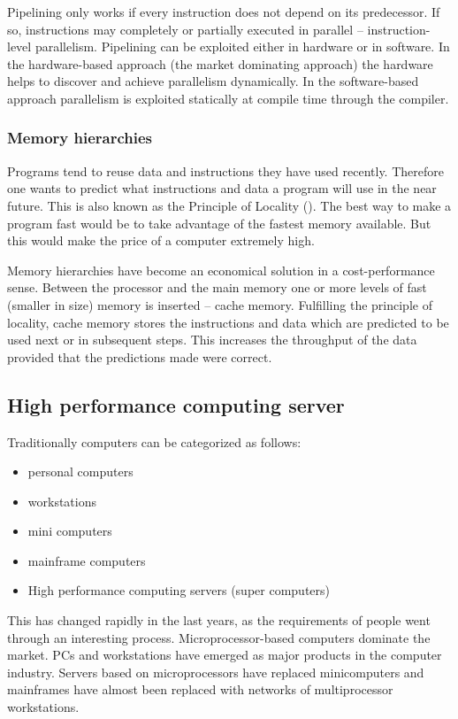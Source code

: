 Pipelining only works if every instruction does not depend on its
predecessor. If so, instructions may completely or partially executed
in parallel -- instruction-level parallelism.
Pipelining can be
exploited either in hardware or in software. In the hardware-based
approach (the market dominating approach) the hardware helps to
discover and achieve parallelism dynamically. In the software-based
approach parallelism is exploited statically at compile time through the
compiler. 

\subsubsection{Memory hierarchies}

Programs tend to reuse data and instructions they have used
recently. Therefore one wants to predict what instructions and data a
program will use in the near future. This is also known as the
Principle of Locality (\cite{computerarchitecture}). The best way to
make a program fast would be to take advantage of the fastest memory
available. But this would make the price of a computer extremely
high.

Memory hierarchies have become an economical solution in a
cost-performance sense. Between the processor and the main memory one
or more levels of fast (smaller in size) memory is inserted -- cache
memory. Fulfilling the principle of locality, cache memory stores the
instructions and data which are predicted to be used next or in
subsequent steps. This increases the throughput of the data provided that
the predictions made were correct.

\subsection{High performance computing server}

Traditionally computers can be categorized as follows:
\begin{itemize}
\item personal computers
\item workstations
\item mini computers
\item mainframe computers
\item High performance computing servers (super computers)
\end{itemize}

This has changed rapidly in the last years, as the requirements of
people went through an interesting process. Microprocessor-based
computers dominate the market. PCs and workstations have emerged as
major products in the computer industry. Servers based on
microprocessors have replaced minicomputers and mainframes have almost
been replaced with networks of multiprocessor workstations.


